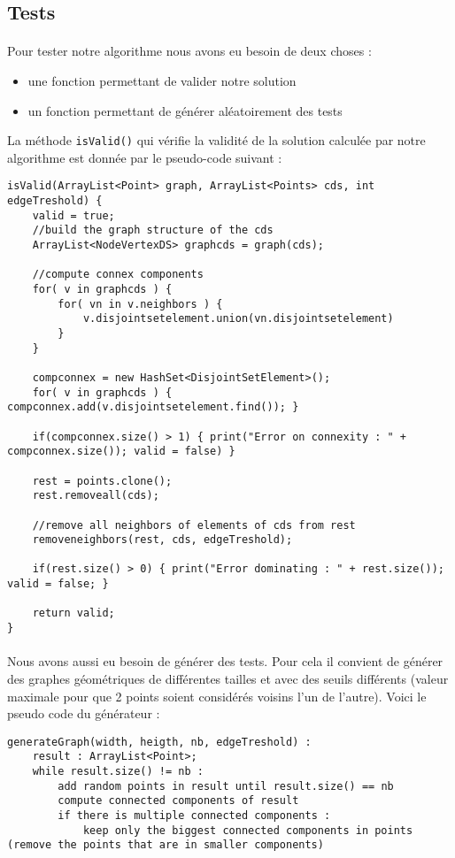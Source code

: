 \subsection{Tests}

\paragraph{}
Pour tester notre algorithme nous avons eu besoin de deux choses :
\begin{itemize}
\item une fonction permettant de valider notre solution
\item un fonction permettant de générer aléatoirement des tests
\end{itemize}

La méthode \verb?isValid()? qui vérifie la validité de la solution calculée par notre algorithme est donnée par le pseudo-code suivant :
\begin{lstlisting}
isValid(ArrayList<Point> graph, ArrayList<Points> cds, int edgeTreshold) {
	valid = true;
	//build the graph structure of the cds
	ArrayList<NodeVertexDS> graphcds = graph(cds);
	
	//compute connex components
	for( v in graphcds ) {
		for( vn in v.neighbors ) {
			v.disjointsetelement.union(vn.disjointsetelement)
		}
	}
	
	compconnex = new HashSet<DisjointSetElement>();
	for( v in graphcds ) { compconnex.add(v.disjointsetelement.find()); }
	
	if(compconnex.size() > 1) { print("Error on connexity : " + compconnex.size()); valid = false) }
	
	rest = points.clone();
	rest.removeall(cds);
	
	//remove all neighbors of elements of cds from rest
	removeneighbors(rest, cds, edgeTreshold);
	
	if(rest.size() > 0) { print("Error dominating : " + rest.size()); valid = false; }
	
	return valid;
}
\end{lstlisting}

\paragraph{}
Nous avons aussi eu besoin de générer des tests. Pour cela il convient de générer des graphes géométriques de différentes tailles et avec des seuils différents (valeur maximale pour que 2 points soient considérés voisins l'un de l'autre).
Voici le pseudo code du générateur :
\begin{lstlisting}
generateGraph(width, heigth, nb, edgeTreshold) :
	result : ArrayList<Point>;
	while result.size() != nb :
		add random points in result until result.size() == nb
		compute connected components of result
		if there is multiple connected components :
			keep only the biggest connected components in points (remove the points that are in smaller components)
\end{lstlisting}

